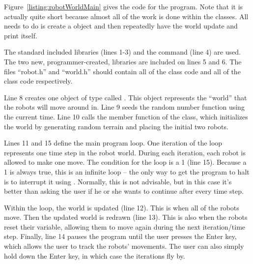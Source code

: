 Figure~\ref{listing:robotWorldMain} gives the code for the  program.  Note that it is actually quite short because almost all of the work is done within the classes.  All  needs to do is create a  object and then repeatedly have the world update and print itself.  


The standard included libraries (lines 1-3) and the  command (line 4) are used.  The two new, programmer-created, libraries are included on lines 5 and 6.  The files ``robot.h'' and ``world.h'' should contain all of the  class code and all of the  class code respectively.  



Line 8 creates one object of type  called .  This object represents the ``world'' that the robots will move around in.  Line 9 seeds the random number function using the current time.  Line 10 calls the  member function of the  class, which initializes the world by generating random terrain and placing the initial two robots.  


Lines 11 and 15 define the main program loop.  One iteration of the loop represents one time step in the robot world. During each iteration, each robot is allowed to make one move.  The condition for the loop is a 1 (line 15).  Because a 1 is always true, this is an infinite loop -- the only way to get the program to halt is to interrupt it using .  Normally, this is not advisable, but in this case it's better than asking the user if he or she wants to continue after every time step.  

Within the loop, the world is updated (line 12).  This is when all of the robots move.  Then the updated world is redrawn (line 13).  This is also when the robots reset their  variable, allowing them to move again during the next iteration/time step.  Finally, line 14 pauses the program until the user presses the Enter key, which allows the user to track the robots' movements.  The user can also simply hold down the Enter key, in which case the iterations fly by.  


